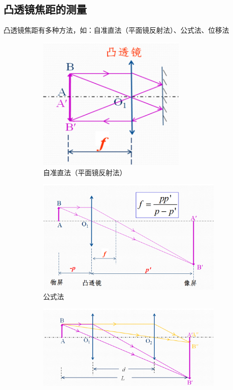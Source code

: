 \documentclass[12pt,a4paper]{article}
\begin{document}
		\subsection{凸透镜焦距的测量}
			凸透镜焦距有多种方法，如：自准直法（平面镜反射法）、公式法、位移法
			\begin{figure}[H]
				\centering
				\begin{subfigure}{0.32\textwidth}
					\centering
					\includegraphics[width=0.8\textwidth]{自准直.png}
					\caption{自准直法（平面镜反射法）}
				\end{subfigure}
				\begin{subfigure}{0.32\textwidth}
					\centering
					\includegraphics[width=\textwidth]{公式法.png}
					\caption{公式法}
				\end{subfigure}
				\begin{subfigure}{0.32\textwidth}
					\centering
					\includegraphics[width=1.2\textwidth]{位移法.png}

\end{subfigure}
\end{figure}
\end{document}

